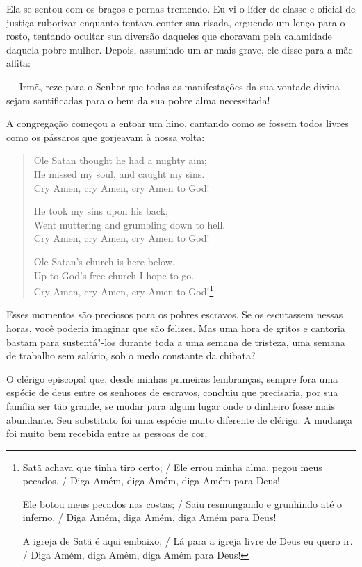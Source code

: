 Ela se sentou com os braços e pernas
tremendo. Eu vi o líder de classe e oficial de justiça ruborizar
enquanto tentava conter sua risada, erguendo um lenço para o rosto,
tentando ocultar sua diversão daqueles que choravam pela calamidade
daquela pobre mulher. Depois, assumindo um ar mais grave, ele disse para
a mãe aflita:

--- Irmã, reze para o Senhor que todas as manifestações da sua vontade
divina sejam santificadas para o bem da sua pobre alma necessitada!

A congregação começou a entoar um hino,
cantando como se fossem todos livres como os pássaros que gorjeavam à
nossa volta:

\begin{verse}
Ole Satan thought he had a mighty aim;\\
He missed my soul, and caught my sins.\\
Cry Amen, cry Amen, cry Amen to God! 

He took my sins upon his back;\\
Went muttering and grumbling down to hell.\\
Cry Amen, cry Amen, cry Amen to God! 

Ole Satan's church is here below.\\
Up to God's free church I hope to go.\\
Cry Amen, cry Amen, cry Amen to God!\footnote{Satã achava que tinha tiro
certo; / Ele errou minha alma, pegou meus pecados. / Diga Amém, diga
Amém, diga Amém para Deus!

Ele botou meus pecados nas
costas; / Saiu resmungando e grunhindo até o inferno. / Diga Amém, diga
Amém, diga Amém para Deus!

A igreja de Satã é aqui embaixo; / Lá para a igreja livre de Deus eu
quero ir. / Diga Amém, diga Amém,
diga Amém para Deus!}
\end{verse}

Esses momentos são preciosos para os
pobres escravos. Se os escutassem nessas horas, você poderia imaginar
que são felizes. Mas uma hora de gritos e cantoria bastam para
sustentá"-los durante toda a uma semana de tristeza, uma semana de
trabalho sem salário, sob o medo constante da chibata?

O clérigo episcopal que, desde minhas
primeiras lembranças, sempre fora uma espécie de deus entre os senhores
de escravos, concluiu que precisaria, por sua família ser tão grande, se
mudar para algum lugar onde o dinheiro fosse mais abundante. Seu
substituto foi uma espécie muito diferente de clérigo. A mudança foi
muito bem recebida entre as pessoas de cor.

